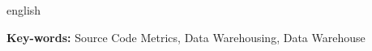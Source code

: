 \begin{resumo}[Abstract]
 \begin{otherlanguage*}{english}


\textbf{Key-words:} Source Code Metrics,  Data Warehousing, Data Warehouse

 \end{otherlanguage*}
\end{resumo}